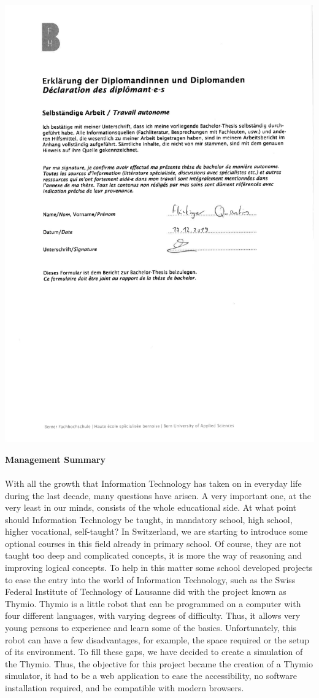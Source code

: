 \documentclass{scrbook}
\begin{document}
\includegraphics[width=\textwidth]{pdf/Declaration_of_authonomy.pdf}
\clearpage

\textbf{\large{Management Summary}}\\
\\
With all the growth that Information Technology has taken on in everyday life during the last decade, many questions have arisen. A very important one, at the very least in our minds, consists of the whole educational side. 
At what point should Information Technology be taught, in mandatory school, high school, higher vocational, self-taught? In Switzerland, we are starting to introduce some optional courses in this field already in primary school. 
Of course, they are not taught too deep and complicated concepts, it is more the way of reasoning and improving logical concepts. To help in this matter some school developed projects to ease the entry into the world of Information Technology, 
such as the Swiss Federal Institute of Technology of Lausanne did with the project known as Thymio. Thymio is a little robot that can be programmed on a computer with four different languages, with varying degrees of difficulty. 
Thus, it allows very young persons to experience and learn some of the basics. Unfortunately, this robot can have a few disadvantages, for example, the space required or the setup of its environment. 
To fill these gaps, we have decided to create a simulation of the Thymio.
Thus, the objective for this project became the creation of a Thymio simulator, it had to be a web application to ease the accessibility, no software installation required, and be compatible with modern browsers.
\end{document}
